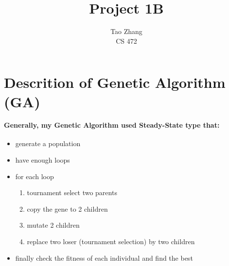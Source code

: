 \documentclass[12pt]{article}
\begin{document}
\title{Project 1B}

\author{Tao Zhang\\
CS 472}

\maketitle
\newpage


\section{Descrition of Genetic Algorithm (GA)}
\paragraph{Generally, my Genetic Algorithm used Steady-State type that: } 
\begin{itemize}
	\item generate a population
	\item have enough loops
	\item for each loop 
	\begin{enumerate}
		\item tournament select two parents
		\item copy the gene to 2 children
		\item mutate 2 children
		\item replace two loser (tournament selection) by two children
	\end{enumerate}
	\item finally check the fitness of each individual and find the best
\end{itemize}
\end{document}
